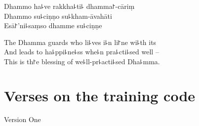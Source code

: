 Dhammo ha꜕ve rakkha꜕ti꜕ dhamma꜓-cāriṃ\\
Dhammo su꜕ciṇṇo su꜕kham-āvahāti\\
Esā꜓'ni꜕saṃso dhamme su꜕ciṇṇe

\begin{english}
  The Dhamma guards who li꜕ves i꜕n li꜓ne wi꜕th its\\
  And leads to ha꜕ppi꜕ne꜕ss whe꜕n pra꜕cti꜕sed well --\\
  This is th꜓e blessing of we꜕ll-pr꜕acti꜕sed Dha꜕mma.
\end{english}

\chapter{Verses on the training code}%

\begin{leader}
\end{leader}

\begin{instruction}
  Version One
\end{instruction}

